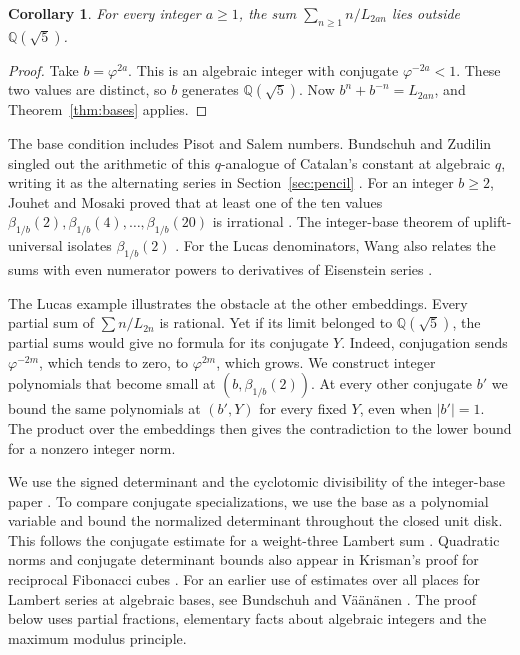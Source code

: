 \documentclass[11pt,letterpaper]{article}
\newcommand{\Q}{\mathbb Q}
\newtheorem{corollary}[theorem]{Corollary}
\begin{document}
\begin{corollary}\label{cor:lucas}
For every integer \(a\ge1\), the sum
\(\displaystyle\sum_{n\ge1}n/L_{2an}\) lies outside \(\Q(\sqrt5)\).
\end{corollary}
\begin{proof}
Take \(b=\varphi^{2a}\). This is an algebraic integer with conjugate
\(\varphi^{-2a}<1\). These two values are distinct, so \(b\) generates
\(\Q(\sqrt5)\). Now \(b^n+b^{-n}=L_{2an}\), and Theorem~\ref{thm:bases}
applies.
\end{proof}

The base condition includes Pisot and Salem numbers. Bundschuh and
Zudilin singled out the arithmetic of this \(q\)-analogue of Catalan's
constant at algebraic \(q\), writing it as the alternating series in
Section~\ref{sec:pencil} \cite[\S6, p.~121]{bz}. For an integer
\(b\ge2\), Jouhet and Mosaki proved that at least one of the ten values
\(\beta_{1/b}(2),\beta_{1/b}(4),\ldots,\beta_{1/b}(20)\) is irrational
\cite[Corollary~1.3]{jm}. The integer-base theorem of uplift-universal
isolates \(\beta_{1/b}(2)\) \cite[Theorem~1.1]{uplift}. For the Lucas
denominators, Wang also relates the sums with even numerator powers to
derivatives of Eisenstein series \cite[Lemma~5.1 and Corollary~5.2 of the preprint]{wang}.

The Lucas example illustrates the obstacle at the other embeddings.
Every partial sum of \(\sum n/L_{2n}\) is rational. Yet if its limit
belonged to \(\Q(\sqrt5)\), the partial sums would give no formula for
its conjugate \(Y\). Indeed, conjugation sends \(\varphi^{-2m}\), which tends to zero, to
\(\varphi^{2m}\), which grows. We construct integer polynomials that
become small at \((b,\beta_{1/b}(2))\). At every other conjugate \(b'\)
we bound the same polynomials at \((b',Y)\) for every fixed \(Y\), even
when \(\lvert b'\rvert=1\). The product over the embeddings then gives
the contradiction to the lower bound for a nonzero integer norm.

We use the signed determinant and the cyclotomic divisibility of the
integer-base paper \cite[\S\S2--7]{uplift}. To compare conjugate
specializations, we use the base as a polynomial variable and bound the
normalized determinant throughout the closed unit disk. This follows the
conjugate estimate for a weight-three Lambert sum
\cite[\S\S4 and 6]{weight3}. Quadratic norms and conjugate determinant
bounds also appear in Krisman's proof for reciprocal Fibonacci cubes
\cite[\S5]{krisman}. For an earlier use of estimates over all places
for Lambert series at algebraic bases, see Bundschuh and Väänänen
\cite[\S2]{bv}. The proof below uses partial fractions,
elementary facts about algebraic integers and the maximum modulus principle.
\end{document}
